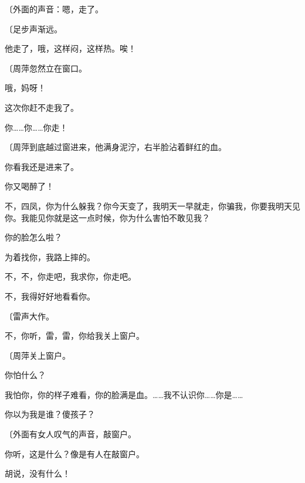 {\fangsong〔外面的声音：嗯，走了。}

{\fangsong〔足步声渐远。}

他走了，哦，这样闷，这样热。唉！

{\fangsong〔周萍忽然立在窗口。}

哦，妈呀！

这次你赶不走我了。

你……你……你走！

{\fangsong〔周萍到底越过窗进来，他满身泥泞，右半脸沾着鲜红的血。}

你看我还是进来了。

你又喝醉了！

不，四凤，你为什么躲我？你今天变了，我明天一早就走，你骗我，你要我明天见你。我能见你就是这一点时候，你为什么害怕不敢见我？

你的脸怎么啦？

为着找你，我路上摔的。

不，不，你走吧，我求你，你走吧。

不，我得好好地看看你。

{\fangsong〔雷声大作。}

不，你听，雷，雷，你给我关上窗户。

{\fangsong〔周萍关上窗户。}

你怕什么？

我怕你，你的样子难看，你的脸满是血。……我不认识你……你是……

你以为我是谁？傻孩子？

{\fangsong〔外面有女人叹气的声音，敲窗户。}

你听，这是什么？像是有人在敲窗户。

胡说，没有什么！

